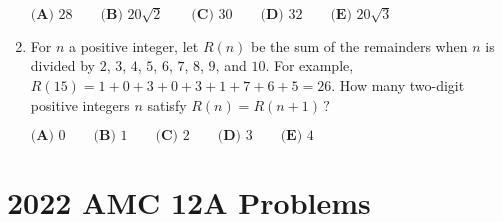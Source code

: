 \documentclass{article}
\begin{document}
\begin{enumerate}[label=\arabic*., itemsep=0.5em]
\(\textbf{(A) } 28 \qquad \textbf{(B) } 20\sqrt{2} \qquad \textbf{(C) } 30 \qquad \textbf{(D) } 32 \qquad \textbf{(E) } 20\sqrt{3}\)\par \vspace{0.5em}\item For \(n\) a positive integer, let \(R(n)\) be the sum of the remainders when \(n\) is divided by \(2\), \(3\), \(4\), \(5\), \(6\), \(7\), \(8\), \(9\), and \(10\). For example, \(R(15) = 1+0+3+0+3+1+7+6+5=26\). How many two-digit positive integers \(n\) satisfy \(R(n) = R(n+1)\,?\)

\(\textbf{(A) }0\qquad\textbf{(B) }1\qquad\textbf{(C) }2\qquad\textbf{(D) }3\qquad\textbf{(E) }4\)\par \vspace{0.5em}\end{enumerate}\newpage\section*{2022 AMC 12A Problems}
\end{document}

